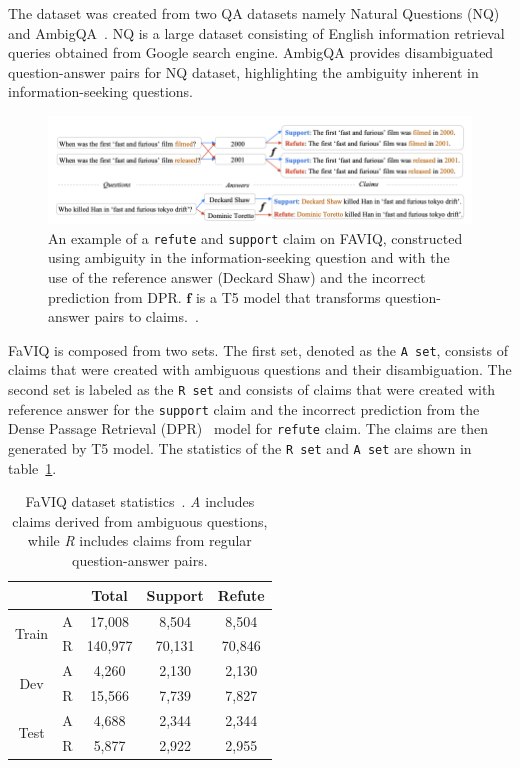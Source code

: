 The dataset was created from two QA datasets namely Natural Questions (NQ)~\cite{NQ} and AmbigQA~\cite{ambigqa}. NQ is a large dataset consisting of English information retrieval queries obtained from Google search engine. AmbigQA provides disambiguated question-answer pairs for NQ dataset, highlighting the ambiguity inherent in information-seeking questions.

\begin{figure}[H]
    \centering
    \includegraphics[scale=0.45]{figures/faviq_ambiguity.png}
    \caption{An example of a \texttt{refute} and \texttt{support} claim on FAVIQ, constructed using ambiguity in the information-seeking question and with the use of the reference answer (Deckard Shaw) and the incorrect prediction from DPR. $\boldsymbol{f}$ is a T5 model that transforms question-answer pairs to claims.~\cite{faviq}.}
    \label{fig:faviq1}
\end{figure}

FaVIQ is composed from two sets. The first set, denoted as the \texttt{A set}, consists of claims that were created with ambiguous questions and their disambiguation. The second set is labeled as the \texttt{R set} and consists of claims that were created with reference answer for the \texttt{support} claim and the incorrect prediction from the Dense Passage Retrieval (DPR)~\cite{DPR} model for \texttt{refute} claim. The claims are then generated by T5 model. The statistics of the \texttt{R set} and \texttt{A set} are shown in table~\ref{tab:faviq1}.

\begin{table}[h]
    \centering
    \begin{tabular}{ccccc}
        \hline
         &  & Total & Support & Refute \\
        \hline
        \multirow{2}{*}{Train} & A & 17,008 & 8,504 & 8,504 \\
         & R & 140,977 & 70,131 & 70,846 \\
        \hline
        \multirow{2}{*}{Dev} & A & 4,260 & 2,130 & 2,130 \\
         & R & 15,566 & 7,739 & 7,827 \\
        \hline
        \multirow{2}{*}{Test} & A & 4,688 & 2,344 & 2,344 \\
         & R & 5,877 & 2,922 & 2,955 \\
        \hline
    \end{tabular}
    \caption{FaVIQ dataset statistics~\cite{faviq}. \emph{A} includes claims derived from ambiguous questions, while \emph{R} includes claims from regular question-answer pairs.}
    \label{tab:faviq1}
\end{table}


